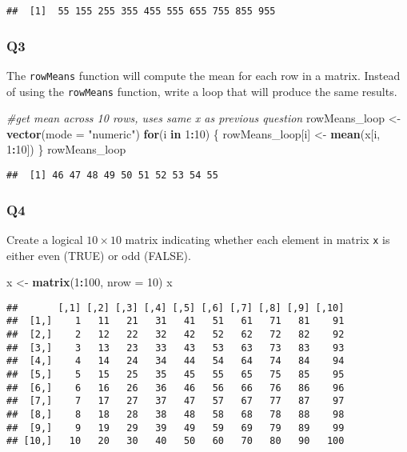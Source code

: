 \documentclass[
]{article}
\newenvironment{Shaded}{\begin{snugshade}}{\end{snugshade}}
\newcommand{\CommentTok}[1]{\textcolor[rgb]{0.56,0.35,0.01}{\textit{#1}}}
\newcommand{\ControlFlowTok}[1]{\textcolor[rgb]{0.13,0.29,0.53}{\textbf{#1}}}
\newcommand{\DataTypeTok}[1]{\textcolor[rgb]{0.13,0.29,0.53}{#1}}
\newcommand{\DecValTok}[1]{\textcolor[rgb]{0.00,0.00,0.81}{#1}}
\newcommand{\KeywordTok}[1]{\textcolor[rgb]{0.13,0.29,0.53}{\textbf{#1}}}
\newcommand{\NormalTok}[1]{#1}
\newcommand{\OperatorTok}[1]{\textcolor[rgb]{0.81,0.36,0.00}{\textbf{#1}}}
\newcommand{\StringTok}[1]{\textcolor[rgb]{0.31,0.60,0.02}{#1}}
\begin{document}
\begin{verbatim}
##  [1]  55 155 255 355 455 555 655 755 855 955
\end{verbatim}

\hypertarget{q3}{%
\subsubsection{Q3}\label{q3}}

The \texttt{rowMeans} function will compute the mean for each row in a
matrix. Instead of using the \texttt{rowMeans} function, write a loop
that will produce the same results.

\begin{Shaded}
\begin{Highlighting}[]
\CommentTok{#get mean across 10 rows, uses same x as previous question}
\NormalTok{rowMeans_loop <-}\StringTok{ }\KeywordTok{vector}\NormalTok{(}\DataTypeTok{mode =} \StringTok{"numeric"}\NormalTok{)}
\ControlFlowTok{for}\NormalTok{(i }\ControlFlowTok{in} \DecValTok{1}\OperatorTok{:}\DecValTok{10}\NormalTok{) \{}
\NormalTok{  rowMeans_loop[i] <-}\StringTok{ }\KeywordTok{mean}\NormalTok{(x[i, }\DecValTok{1}\OperatorTok{:}\DecValTok{10}\NormalTok{])}
\NormalTok{\}}
\NormalTok{rowMeans_loop}
\end{Highlighting}
\end{Shaded}

\begin{verbatim}
##  [1] 46 47 48 49 50 51 52 53 54 55
\end{verbatim}

\hypertarget{q4}{%
\subsubsection{Q4}\label{q4}}

Create a logical \(10 \times 10\) matrix indicating whether each element
in matrix \texttt{x} is either even (TRUE) or odd (FALSE).

\begin{Shaded}
\begin{Highlighting}[]
\NormalTok{x <-}\StringTok{ }\KeywordTok{matrix}\NormalTok{(}\DecValTok{1}\OperatorTok{:}\DecValTok{100}\NormalTok{, }\DataTypeTok{nrow =} \DecValTok{10}\NormalTok{)}
\NormalTok{x}
\end{Highlighting}
\end{Shaded}

\begin{verbatim}
##       [,1] [,2] [,3] [,4] [,5] [,6] [,7] [,8] [,9] [,10]
##  [1,]    1   11   21   31   41   51   61   71   81    91
##  [2,]    2   12   22   32   42   52   62   72   82    92
##  [3,]    3   13   23   33   43   53   63   73   83    93
##  [4,]    4   14   24   34   44   54   64   74   84    94
##  [5,]    5   15   25   35   45   55   65   75   85    95
##  [6,]    6   16   26   36   46   56   66   76   86    96
##  [7,]    7   17   27   37   47   57   67   77   87    97
##  [8,]    8   18   28   38   48   58   68   78   88    98
##  [9,]    9   19   29   39   49   59   69   79   89    99
## [10,]   10   20   30   40   50   60   70   80   90   100
\end{verbatim}
\end{document}
